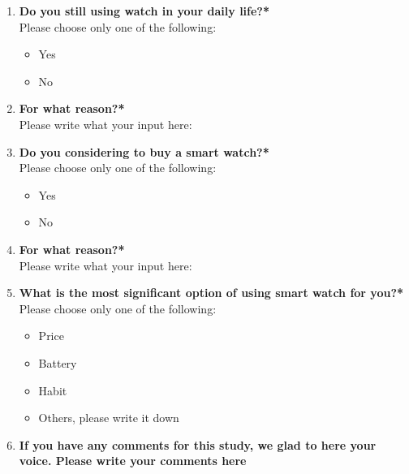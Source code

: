 \begin{enumerate}
      \item \textbf{Do you still using watch in your daily life?*}\\
      Please choose only one of the following:
      \begin{itemize}
          \item Yes
          \item No
      \end{itemize}
      \item \textbf{For what reason?*}\\
      Please write what your input here:
      \item \textbf{Do you considering to buy a smart watch?*}\\
      Please choose only one of the following:
      \begin{itemize}
          \item Yes
          \item No
      \end{itemize}
      \item \textbf{For what reason?*}\\
      Please write what your input here:
      \item \textbf{What is the most significant option of using smart watch for you?*}\\
      Please choose only one of the following:
      \begin{itemize}
          \item Price
          \item Battery
          \item Habit
          \item Others, please write it down
      \end{itemize}
      \item \textbf{If you have any comments for this study, we glad to here your voice. Please write your comments here}
  \end{enumerate}
